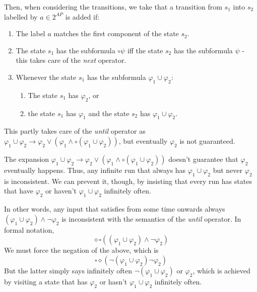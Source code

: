 Then, when considering the transitions, we take that a transition from \(s_1\) into \(s_2\) labelled by \(a \in 2^{AP}\) is added if:
\begin{enumerate}
    \item The label \(a\) matches the first component of the state \(s_2\).
    \item The state \(s_1\) has the subformula \(\circ \psi\) iff the state \(s_2\) has the subformula \(\psi\) - this takes care of the \textit{next} operator.
    \item Whenever the state \(s_1\) has the subformula \(\varphi_1 \cup \varphi_2\):
        \begin{enumerate}
            \item The state \(s_1\) has \(\varphi_2\), or
            \item the state \(s_1\) has \(\varphi_1\) and the state \(s_2\) has \(\varphi_1 \cup \varphi_2\).
        \end{enumerate}
\end{enumerate}
This partly takes care of the \textit{until} operator as \(\varphi_1 \cup \varphi_2 \rightarrow \varphi_2 \lor (\varphi_1 \land \circ (\varphi_1 \cup \varphi_2))\), but eventually \(\varphi_2\) is not guaranteed.

The expansion \(\varphi_1 \cup \varphi_2 \rightarrow \varphi_2 \lor (\varphi_1 \land \circ (\varphi_1 \cup \varphi_2))\) doesn't guarantee that \(\varphi_2\) eventually happens.
Thus, any infinite run that always has \(\varphi_1 \cup \varphi_2\) but never \(\varphi_2\) is inconsistent.
We can prevent it, though, by insisting that every run has states that have \(\varphi_2\) or haven't \(\varphi_1 \cup \varphi_2\) infinitely often.

In other words, any input that satisfies from some time onwards always \((\varphi_1 \cup \varphi_2) \land \lnot \varphi_2\) is inconsistent with the semantics of the \textit{until} operator.
In formal notation,
\begin{equation}
    \diamond \square ((\varphi_1 \cup \varphi_2) \land \lnot \varphi_2)
\end{equation}
We must force the negation of the above, which is
\begin{equation}
    \square \diamond (\lnot(\varphi_1 \cup \varphi_2) \lnot \varphi_2)
\end{equation}
But the latter simply says infinitely often \(\lnot (\varphi_1 \cup \varphi_2)\) or \(\varphi_2\), which is achieved by visiting a state that has \(\varphi_2\) or hasn't \(\varphi_1 \cup \varphi_2\) infinitely often.

